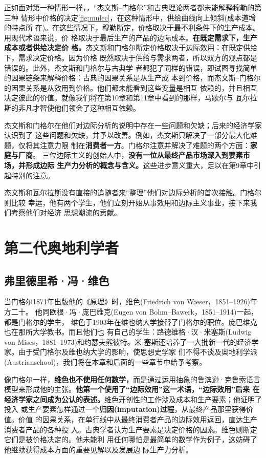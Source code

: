 正如面对第一种情形一样，，“杰文斯--门格尔”和古典理论两者都未能解释穆勒的第三种
情形中价格的决定\cref{fig:mulec}，在这种情形中，供给曲线向上倾斜(成本道增的特点所
在)。在这些情况下，穆勒断定，价格取决于最不利条件下的生产成本。用现代术语来说，价
格取决于最后生产的产品的边际成本。\textbf{在既定需求下，生产成本或者供给决定价
  格。}杰文斯和门格尔断定价格取决于边际效用：在既定供给下，需求决定价格。因为价格
既然取决于供给与需求两者，所以双方的观点都是错误的。此外，杰文斯和门格尔与古典学
者都犯了同样的错误，即试图寻找简单的因果链条来解释价格：古典的因果关系是从生产成
本到价格，而杰文斯--门格尔的因果关系是从效用到价格。他们都未能看到这些变量是相互
依赖的，并且相互决定彼此的价值。就像我们将在第10章和第11章中看到的那样，马歇尔与
瓦尔拉斯的非凡才智使他们领会了这种相互依赖。

杰文斯和门格尔在他们对边际分析的说明中存在一些问题和欠缺；后来的经济学家认识到了
这些问题和欠缺，并予以改善。例如，杰文斯只解决了一部分最大化难题，仅将其注意力限
制在\textbf{消费者一方}。门格尔注意并解决了难题的两个方面：\textbf{家庭与厂商}。
三位边际主义的创始人中，\textbf{没有一位从最终产品市场深入到要素市场，并形成边际
  生产力分析的概念与含义。}这些进步意义重大，足以在第9章中引起特别的注意。

杰文斯和瓦尔拉斯没有直接的追随者来“整理”他们对边际分析的首次接触。门格尔则比较
幸运，他有两个学生，他们立刻开始从事效用和边际主义事业，接下来我们考察他们对经济
思想潮流的贡献。

\section{第二代奥地利学者}

\subsection{弗里德里希·冯·维色}

当门格尔1871年出版他的《原理》时，维色(Friedrich von Wieser，1851--1926)年方二十。
他同欧根·冯·庞巴维克(Eugen von Bohm--Bawerk，1851--1914)一起，都是门格尔的学生，
维色于1903年在维也纳大学接替了门格尔的职位。庞巴维克也在那所大学教书。而且他们也
有自己的学生：路德维格·汉·米塞斯(Ludwig von Mises，1881--1973)和约瑟夫熊彼特。米
塞斯还培养了一大批新一代的经济学家。由于受门格尔及维也纳大学的影响，使思想史学家
们不得不谈及奥地利学派(Austrianschool)，我们将在本章和后面的一些章节中给予考察。

像门格尔一样，\textbf{维色也不使用任何数学，}而是通过运用抽象的鲁滨逊·克鲁索语言
模型来形成他的主张。\textbf{他第一个使用了“边际效用”这一术语，“边际效用”后来
  在经济学家之间成为公认的表述。}维色开创性的工作涉及成本和生产要素；他证明了投入
或生产要素怎样通过一个\textbf{归因(imputation)过程}，从最终产品那里获得价值。价值
的因果关系，在单行线中从最终消费者产品的边际效用返回，直达生产消费者产品的各种投
入。古典学者认为生产要素是决定价格的因素。维色则断定它们是被价格决定的。他未能利
用任何哪怕是最简单的数学作为例子，这妨碍了他继续获得成本方面的重要见解以及发展边
际生产力分析。

